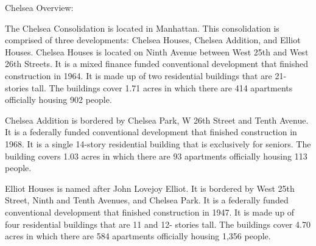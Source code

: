 Chelsea Overview:     

   

The Chelsea Consolidation is located in Manhattan. This consolidation is comprised of three developments: Chelsea Houses, Chelsea Addition, and Elliot Houses. Chelsea Houses is located on Ninth Avenue between West 25th and West 26th Streets. It is a mixed finance funded conventional development that finished construction in 1964. It is made up of two residential buildings that are 21- stories tall. The buildings cover 1.71 acres in which there are 414 apartments officially housing 902 people. 

Chelsea Addition is bordered by Chelsea Park, W 26th Street and Tenth Avenue. It is a federally funded conventional development that finished construction in 1968. It is a single 14-story residential building that is exclusively for seniors. The building covers 1.03 acres in which there are 93 apartments officially housing 113 people. 

Elliot Houses is named after John Lovejoy Elliot. It is bordered by West 25th Street, Ninth and Tenth Avenues, and Chelsea Park. It is a federally funded conventional development that finished construction in 1947. It is made up of four residential buildings that are 11 and 12- stories tall. The buildings cover 4.70 acres in which there are 584 apartments officially housing 1,356 people. 